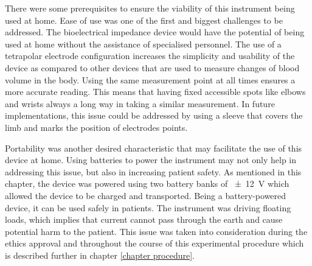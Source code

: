 There were some prerequisites to ensure the viability of this instrument being used at home. Ease of use was one of the first and biggest challenges to be addressed. The bioelectrical impedance device would have the potential of being used at home without the assistance of specialised personnel. The use of a tetrapolar electrode configuration increases the simplicity and usability of the device as compared to other devices that are used to measure changes of blood volume in the body. Using the same measurement point at all times ensures a more accurate reading. This means that having fixed accessible spots like elbows and wrists always a long way in taking a similar measurement. In future implementations, this issue could be addressed by using a sleeve that covers the limb and marks the position of electrodes points. 

Portability was another desired characteristic that may facilitate the use of this device at home. Using batteries to power the instrument may not only help in addressing this issue, but also in increasing patient safety. As mentioned in this chapter, the device was powered using two battery banks of \SI{\pm 12}{\volt} which allowed the device to be charged and transported. Being a battery-powered device, it can be used safely in patients. The instrument was driving floating loads, which implies that current cannot pass through the earth and cause potential harm to the patient. This issue was taken into consideration during the ethics approval and throughout the course of this experimental procedure which is described further in chapter \ref{chapter procedure}.





